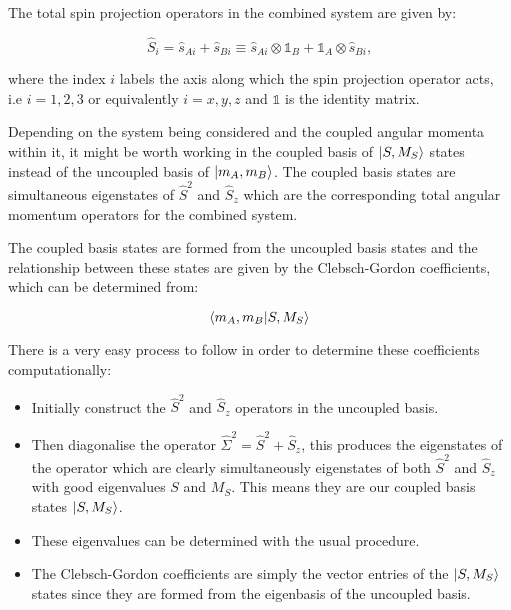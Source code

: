 \documentclass[11pt,a4paper]{article}
\begin{document}
\noindent The total spin projection operators in the combined system are given by:

\begin{equation}
    \hat{S}_i = \hat{s}_{Ai} + \hat{s}_{Bi} \equiv \hat{s}_{Ai} \otimes \mathds{1}_B + \mathds{1}_A \otimes \hat{s}_{Bi},
    \label{TwoSpin1/2SystemSpinProjectionOperators}
\end{equation}

\noindent where the index $i$ labels the axis along which the spin projection operator acts, i.e $i = 1, 2, 3$ or equivalently $i = x, y, z$ and \(\mathds{1}\) is the identity matrix.

\noindent Depending on the system being considered and the coupled angular momenta within it, it might be worth working in the coupled basis of $\ket{S, M_S}$ states instead of the uncoupled basis of $\ket{m_A, m_B}$. The coupled basis states are simultaneous eigenstates of $\hat{S}^2$ and $\hat{S}_z$ which are the corresponding total angular momentum operators for the combined system.

\noindent The coupled basis states are formed from the uncoupled basis states and the relationship between these states are given by the Clebsch-Gordon coefficients, which can be determined from:

\begin{equation}
    \braket{{m_A, m_B}|{S, M_S}}
    \label{ClebschGordonCoefficients}
\end{equation}

\noindent There is a very easy process to follow in order to determine these coefficients computationally:

\begin{itemize}
    \item Initially construct the $\hat{S}^2$ and $\hat{S}_z$ operators in the uncoupled basis.
    \item Then diagonalise the operator $\hat{\Sigma}^2 = \hat{S}^2 + \hat{S}_z$, this produces the eigenstates of the operator which are clearly simultaneously eigenstates of both $\hat{S}^2$ and $\hat{S}_z$ with good eigenvalues $S$ and $M_S$. This means they are our coupled basis states $\ket{S, M_S}$.
    \item These eigenvalues can be determined with the usual procedure.
    \item The Clebsch-Gordon coefficients are simply the vector entries of the $\ket{S, M_S}$ states since they are formed from the eigenbasis of the uncoupled basis.
\end{itemize}
\end{document}

